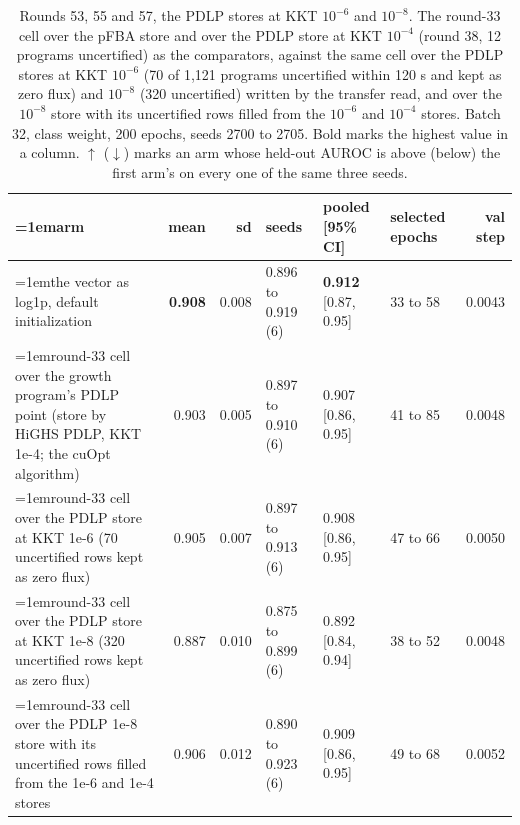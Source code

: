 \begin{table}[H]
  \centering
  \scriptsize
  \setlength{\tabcolsep}{2.5pt}
  \caption[Rounds 53, 55 and 57, the PDLP stores at KKT $10^{-6}$ and $10^{-8}$]{Rounds 53, 55 and 57, the PDLP stores at KKT $10^{-6}$ and $10^{-8}$. The round-33 cell over the pFBA store and over the PDLP store at KKT $10^{-4}$ (round 38, 12 programs uncertified) as the comparators, against the same cell over the PDLP stores at KKT $10^{-6}$ (70 of 1,121 programs uncertified within 120 s and kept as zero flux) and $10^{-8}$ (320 uncertified) written by the transfer read, and over the $10^{-8}$ store with its uncertified rows filled from the $10^{-6}$ and $10^{-4}$ stores. Batch 32, class weight, 200 epochs, seeds 2700 to 2705. Bold marks the highest value in a column. $\uparrow$ ($\downarrow$) marks an arm whose held-out AUROC is above (below) the first arm's on every one of the same three seeds.}
  \label{tab:w69}
  \begin{tabular}{@{}>{\raggedright\hangindent=1em\hangafter=1\arraybackslash}p{84.4mm}rrlllr@{}}
    \hline
    arm & mean & sd & seeds & pooled [95\% CI] & selected epochs & val step \\
    \hline
    the vector as log1p, default initialization & \textbf{0.908} & 0.008 & 0.896 to 0.919 (6) & \textbf{0.912} [0.87, 0.95] & 33 to 58 & 0.0043 \\
    round-33 cell over the growth program's PDLP point (store by HiGHS PDLP, KKT 1e-4; the cuOpt algorithm) & 0.903 & 0.005 & 0.897 to 0.910 (6) & 0.907 [0.86, 0.95] & 41 to 85 & 0.0048 \\
    round-33 cell over the PDLP store at KKT 1e-6 (70 uncertified rows kept as zero flux) & 0.905 & 0.007 & 0.897 to 0.913 (6) & 0.908 [0.86, 0.95] & 47 to 66 & 0.0050 \\
    round-33 cell over the PDLP store at KKT 1e-8 (320 uncertified rows kept as zero flux) & 0.887 & 0.010 & 0.875 to 0.899 (6) & 0.892 [0.84, 0.94] & 38 to 52 & 0.0048 \\
    round-33 cell over the PDLP 1e-8 store with its uncertified rows filled from the 1e-6 and 1e-4 stores & 0.906 & 0.012 & 0.890 to 0.923 (6) & 0.909 [0.86, 0.95] & 49 to 68 & 0.0052 \\
    \hline
  \end{tabular}
\end{table}
